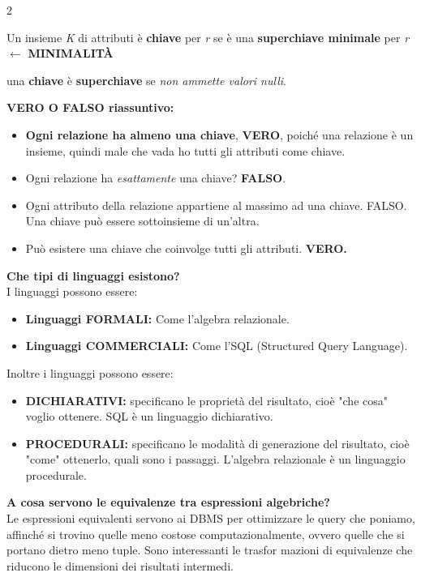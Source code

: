 \documentclass{article}
\begin{document}
\begin{multicols}{2}
\begin{enumerate}[leftmargin=*, align=left]
{		
		\item Un insieme \textit{K} di attributi è \textbf{chiave} per \textit{r} se è una \textbf{superchiave minimale} per \textit{r} $\leftarrow$ \textbf{MINIMALITÀ}
		\item una \textbf{chiave} è \textbf{superchiave} se \textit{non ammette valori nulli}.
	}
	
	\item \textbf{VERO O FALSO riassuntivo:}\begin{itemize}
		\item \textbf{Ogni relazione ha almeno una chiave}, \textbf{VERO}, poiché una relazione è un insieme, quindi male che vada ho tutti gli attributi come chiave. 
		\item Ogni relazione ha \textit{esattamente} una chiave? \textbf{FALSO}.  
		\item Ogni attributo della relazione appartiene al massimo ad una chiave. FALSO. Una chiave può essere sottoinsieme di un'altra. 
		\item Può esistere una chiave che coinvolge tutti gli attributi. \textbf{VERO.}
	\end{itemize}
	
	\item \textbf{Che tipi di linguaggi esistono?}\\
	I linguaggi possono essere: \begin{itemize}
		\item \textbf{Linguaggi FORMALI:} Come l'algebra relazionale.
		\item \textbf{Linguaggi COMMERCIALI:} Come l'SQL (Structured Query Language).
	\end{itemize}
	Inoltre i linguaggi possono essere: \begin{itemize}
		\item \textbf{DICHIARATIVI: }specificano le proprietà del risultato, cioè "che cosa" voglio ottenere. SQL è un linguaggio dichiarativo.
		\item \textbf{PROCEDURALI: }specificano le modalità di generazione del risultato, cioè "come" ottenerlo, quali sono i passaggi. L'algebra relazionale è un linguaggio procedurale.
	\end{itemize}
	
	
	\item \textbf{A cosa servono le equivalenze tra espressioni algebriche?}\\
		Le espressioni equivalenti servono ai DBMS per ottimizzare le query che poniamo, affinché si trovino quelle
	meno costose computazionalmente, ovvero quelle che si portano dietro meno tuple. Sono interessanti le trasfor
	mazioni di equivalenze che riducono le dimensioni dei risultati intermedi.
	

\end{enumerate}
\end{multicols}
\end{document}
